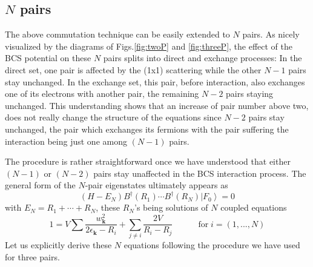 \documentclass[aps,prb,superscriptaddress,showpacs,reprint,lengthcheck]{revtex4}
\begin{document}
\subsection{$N$ pairs}

The above commutation technique can be easily extended to $N$ pairs. As nicely
visualized by the diagrams of Figs.\ref{fig:twoP} and \ref{fig:threeP}, the
effect of the BCS potential on these $N$ pairs splits into direct and exchange processes:
In the direct set, one pair is affected by the (1x1) scattering while the other $N-1
$ pairs stay unchanged. In the exchange set, this pair, before interaction, also 
exchanges one of its electrons with another pair, the remaining $N-2$
pairs staying unchanged. This understanding shows that an increase of pair number above two, does not really change the structure of the equations
since $N-2$ pairs stay unchanged, the pair which exchanges its fermions with the
pair suffering the interaction being just one among $(N-1)$ pairs.

The procedure is rather straightforward once we have understood
that either $(N-1)$ or $(N-2)$ pairs stay unaffected in the BCS interaction process. The
general form of the $N$-pair eigenstates ultimately appears as 
\begin{equation}  \label{eq:SchThreeN}
(H-E _N)B^{\dagger}(R_1)\cdots{}B^{\dagger}(R_N)\left|F_0\right>  =0
\end{equation}
with $E _N=R_1+\cdots+R_N$, these $R_N$'s being solutions of $N$ coupled
equations 
\begin{equation}
1=V\sum\frac{w_{\mathbf{k} }^2}{2\epsilon_{\mathbf{k} }-R_i}+\sum_{j\neq{i}}%
\frac{2V}{R_i-R_j}\quad\qquad \text{for}\; i=\left(1,...,N\right) 
\end{equation}
Let us explicitly derive these $N$ equations following the procedure we have used for three pairs. 
\end{document}
